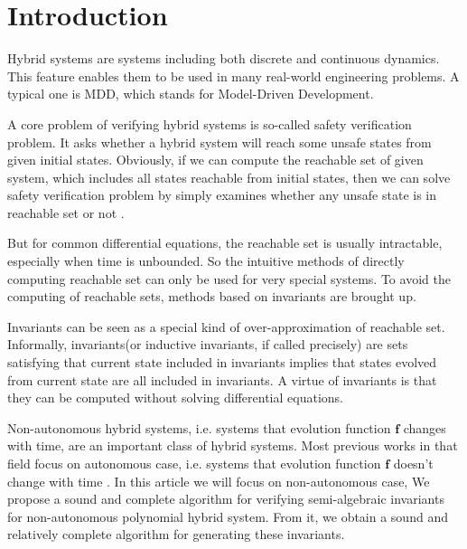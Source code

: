 \documentclass{jssc}
\begin{document}



\section{Introduction}
\label{sec:introduction}
Hybrid systems are systems including both discrete and continuous dynamics. This feature enables them to be used in many real-world engineering problems. A typical one is MDD, which stands for Model-Driven Development\cite{giese2006survey}.

A core problem of verifying hybrid systems is so-called safety verification problem. It asks whether a hybrid system will reach some unsafe states from given initial states. Obviously, if we can compute the reachable set of given system, which includes all states reachable from initial states, then we can solve safety verification problem by simply examines whether any unsafe state is in reachable set or not \cite{clarke2003abstraction}.

But for common differential equations, the reachable set is usually intractable, especially when time is unbounded. So the intuitive methods of directly computing reachable set can only be used for very special systems. To avoid the computing of reachable sets, methods based on invariants are brought up\cite{sankaranarayanan2004constructing, prajna2004safety}.

Invariants can be seen as a special kind of over-approximation of reachable set. Informally, invariants(or inductive invariants, if called precisely) are sets satisfying that current state included in invariants implies that states evolved from current state are all included in invariants. A virtue of invariants is that they can be computed without solving differential equations.

Non-autonomous hybrid systems, i.e. systems that evolution function $\boldsymbol{f}$ changes with time, are an important class of hybrid systems. Most previous works in that field focus on autonomous case, i.e. systems that evolution function $\boldsymbol{f}$ doesn't change with time \cite{liu2011computing}. In this article we will focus on non-autonomous case, We propose a sound and complete algorithm for verifying semi-algebraic invariants for non-autonomous polynomial hybrid system. From it, we obtain a sound and relatively complete algorithm for generating these invariants.
\end{document}
